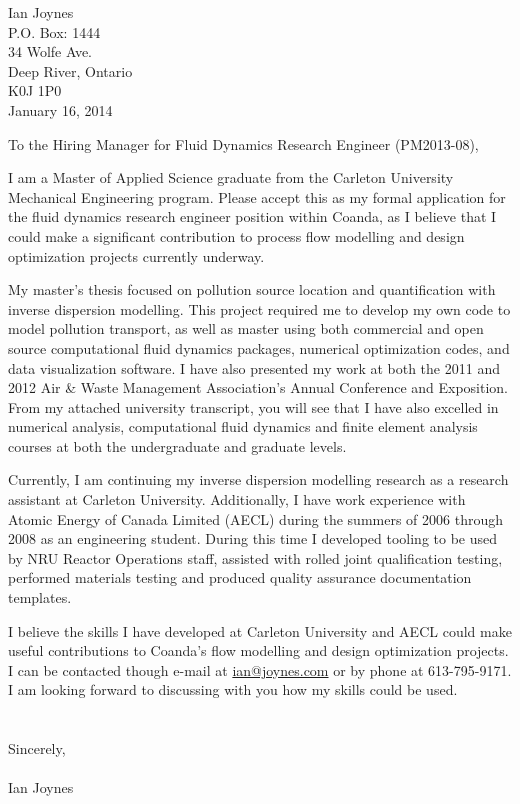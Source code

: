 \documentclass{letter}
\begin{document}
\thispagestyle{empty} %
{\raggedleft Ian Joynes \\
P.O. Box: 1444 \\
34 Wolfe Ave. \\
Deep River, Ontario \\
K0J 1P0 \\ 
 }
\vspace{20pt}
January 16, 2014
\vspace{20pt}


To the Hiring Manager for Fluid Dynamics Research Engineer (PM2013-08),

I am a Master of Applied Science graduate from the Carleton University Mechanical Engineering program. Please accept this as my formal application for the fluid dynamics research engineer position within Coanda, as I believe that I could make a significant contribution to process flow modelling and design optimization projects currently underway.

My master's thesis focused on pollution source location and quantification with inverse dispersion modelling.  This project required me to develop my own code to model pollution transport, as well as master using both commercial and open source computational fluid dynamics packages, numerical optimization codes, and data visualization software.  I have also presented my work at both the 2011 and 2012 Air \& Waste Management Association's Annual Conference and Exposition.  From my attached university transcript, you will see that I have also excelled in numerical analysis, computational fluid dynamics and finite element analysis courses at both the undergraduate and graduate levels.

Currently, I am continuing my inverse dispersion modelling research as a research assistant at Carleton University.  Additionally, I have work experience with Atomic Energy of Canada Limited (AECL) during the summers of 2006 through 2008 as an engineering student. During this time I developed tooling to be used by NRU Reactor Operations staff, assisted with rolled joint qualification testing, performed materials testing and produced quality assurance documentation templates.

I believe the skills I have developed at Carleton University and AECL could make useful contributions to Coanda's flow modelling and design optimization projects. I can be contacted though e-mail at \href{mailto:ian@joynes.com}{ian@joynes.com} or by phone at 613-795-9171. I am looking forward to discussing with you how my skills could be used.\\
\\
\\
Sincerely, \\
\vspace{30pt} \\
Ian Joynes
\end{document}
